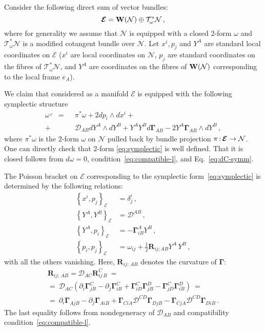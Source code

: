\documentclass[a4paper,11pt]{amsart}
\numberwithin{thm}{section} %
\numberwithin{equation}{section} %
\numberwithin{figure}{section} %
\newcommand{\pb}[2]{\left\{{}#1{},{}#2{}\right\}}
\renewcommand{\:}{{\rm\, :\,}}
\def\d{\partial}
\def\half{{\frac{1}{2}}}
\def\mod{{\mathcal T}^*_\omega}
\def\manN{{\mathcal N}}
\def\E{{ \mathcal E}}
\def\W{{\bf W}}
\def\mcon{{\boldsymbol\Gamma}}
\def\mR{\mathcal{\boldsymbol R}}
\def\mD{\mathcal{D}}
\def\mE{{\boldsymbol{\E}}}
\begin{document}
Consider the following direct sum of vector bundles:
\begin{equation}
  \mE=\W(\manN) \oplus \mod\manN\,,
\end{equation}
where for generality we assume that $\manN$ is equipped with a closed
2-form $\omega$ and $\mod\manN$ is a modified cotangent bundle
over $\manN$.  Let $x^i,p_j$ and $Y^A$ are standard local coordinates
on $\mE$ ($x^i$ are local coordinates on $\manN$, $p_j$ are standard
coordinates on the fibres of $\mod\manN$, and $Y^A$ are coordinates on
the fibres of $\W(\manN)$ corresponding to the local frame $e_A$).

We claim that considered as a manifold $\mE$ is equipped with the following
symplectic structure
\begin{equation}
  \begin{split}
  \label{eq:symplectic}
  \omega^{\,_{\mE}}~~=~~&\pi^*\omega+2dp_i\wedge dx^i+\\
+~&\mD_{AB}dY^A\wedge
  dY^B+ Y^AY^B d\mcon_{AB} -2Y^A\mcon_{AB}\wedge dY^B\,,
\end{split}
\end{equation}
where $\pi^* \omega$ is the 2-form $\omega$
on $\manN$ pulled back by bundle projection $\pi\:\mE \to \manN$.  One
can directly check that 2-form \eqref{eq:symplectic} is well defined.
That it is closed follows from $d \omega=0$,
condition~\eqref{eq:compatible-l}, and Eq.~\eqref{eq:dC-symm}.


The Poisson bracket on $\mE$ corresponding to the symplectic
form~\eqref{eq:symplectic} is determined by the following relations:
\begin{equation}
  \begin{aligned}
    \pb{x^i}{p_j}_{\mE}&=\delta^i_j\,,\\
    \pb{Y^A}{Y^B}_{\mE}&=\mD^{AB}\,,\\
    \pb{Y^A}{p_i}_{\mE}&= - \mcon^A_{iB}Y^B\,,\\
    \pb{p_i}{p_j}_{\mE}&=\omega_{ij}+\half \mR_{ij;AB}Y^A\,Y^B\,,
  \end{aligned}
  \label{eq:extended-PB}
\end{equation}
with all the others vanishing. Here,
$\mR_{ij;\,AB}$ denotes the curvature of $\mcon$:
\begin{multline}
  \mR_{ij;\,AB}=\mD_{AC}\mR^C_{ij\,B}~=\\
=~\mD_{AC}\left(\d_i \mcon^C_{jB}-\d_j \mcon^C_{iB}+\mcon^C_{iD}\mcon^D_{jB}
-\mcon^C_{jD}\mcon^D_{iB}\right)~=\\
  =~\d_i \mcon_{AjB}-\d_j
  \mcon_{AiB}+\mcon_{CiA}\mD^{CD}\mcon_{DjB}-\mcon_{CjA}\mD^{CD}\mcon_{DiB}\,.
\end{multline}
The last equality follows from nondegeneracy of $\mD_{AB}$
and compatibility condition~\eqref{eq:compatible-l}.
\end{document}
